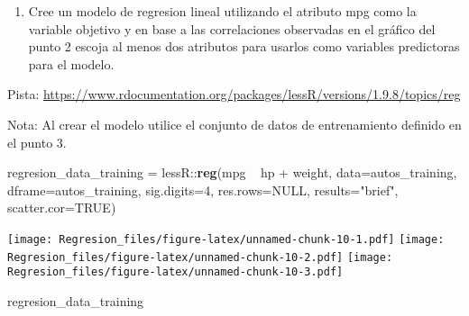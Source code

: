 \documentclass[]{article}
\newenvironment{Shaded}{\begin{snugshade}}{\end{snugshade}}
\newcommand{\KeywordTok}[1]{\textcolor[rgb]{0.13,0.29,0.53}{\textbf{{#1}}}}
\newcommand{\DataTypeTok}[1]{\textcolor[rgb]{0.13,0.29,0.53}{{#1}}}
\newcommand{\DecValTok}[1]{\textcolor[rgb]{0.00,0.00,0.81}{{#1}}}
\newcommand{\StringTok}[1]{\textcolor[rgb]{0.31,0.60,0.02}{{#1}}}
\newcommand{\OtherTok}[1]{\textcolor[rgb]{0.56,0.35,0.01}{{#1}}}
\newcommand{\NormalTok}[1]{{#1}}
\providecommand{\tightlist}{%
  \setlength{\itemsep}{0pt}\setlength{\parskip}{0pt}}
\begin{document}
\begin{enumerate}
\def\labelenumi{\arabic{enumi}.}
\setcounter{enumi}{3}
\tightlist
\item
  Cree un modelo de regresion lineal utilizando el atributo mpg como la
  variable objetivo y en base a las correlaciones observadas en el
  gráfico del punto 2 escoja al menos dos atributos para usarlos como
  variables predictoras para el modelo.
\end{enumerate}

Pista:
\url{https://www.rdocumentation.org/packages/lessR/versions/1.9.8/topics/reg}

Nota: Al crear el modelo utilice el conjunto de datos de entrenamiento
definido en el punto 3.

\begin{Shaded}
\begin{Highlighting}[]
\NormalTok{regresion_data_training =}\StringTok{ }\NormalTok{lessR::}\KeywordTok{reg}\NormalTok{(mpg ~}\StringTok{ }\NormalTok{hp +}\StringTok{ }\NormalTok{weight, }
           \DataTypeTok{data=}\NormalTok{autos_training, }\DataTypeTok{dframe=}\NormalTok{autos_training, }
           \DataTypeTok{sig.digits=}\DecValTok{4}\NormalTok{, }\DataTypeTok{res.rows=}\OtherTok{NULL}\NormalTok{, }\DataTypeTok{results=}\StringTok{"brief"}\NormalTok{, }\DataTypeTok{scatter.cor=}\OtherTok{TRUE}\NormalTok{)}
\end{Highlighting}
\end{Shaded}

\texttt{[image: Regresion\_files/figure-latex/unnamed-chunk-10-1.pdf]}
\texttt{[image: Regresion\_files/figure-latex/unnamed-chunk-10-2.pdf]}
\texttt{[image: Regresion\_files/figure-latex/unnamed-chunk-10-3.pdf]}

\begin{Shaded}
\begin{Highlighting}[]
\NormalTok{regresion_data_training}
\end{Highlighting}
\end{Shaded}
\end{document}
